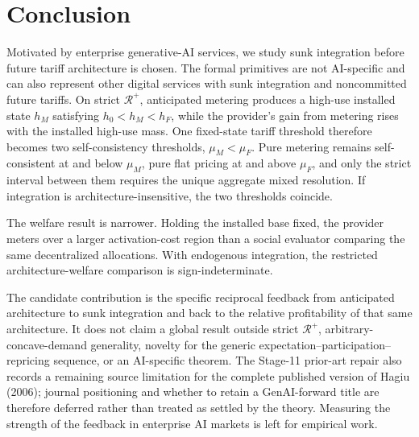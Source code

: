 \section{Conclusion}\label{sec:conclusion}

Motivated by enterprise generative-AI services, we study sunk integration before future tariff architecture is chosen. The formal primitives are not AI-specific and can also represent other digital services with sunk integration and noncommitted future tariffs. On strict $\mathcal R^+$, anticipated metering produces a high-use installed state $h_M$ satisfying $h_0<h_M<h_F$, while the provider's gain from metering rises with the installed high-use mass. One fixed-state tariff threshold therefore becomes two self-consistency thresholds, $\mu_M<\mu_F$. Pure metering remains self-consistent at and below $\mu_M$, pure flat pricing at and above $\mu_F$, and only the strict interval between them requires the unique aggregate mixed resolution. If integration is architecture-insensitive, the two thresholds coincide.

The welfare result is narrower. Holding the installed base fixed, the provider meters over a larger activation-cost region than a social evaluator comparing the same decentralized allocations. With endogenous integration, the restricted architecture-welfare comparison is sign-indeterminate.

The candidate contribution is the specific reciprocal feedback from anticipated architecture to sunk integration and back to the relative profitability of that same architecture. It does not claim a global result outside strict $\mathcal R^+$, arbitrary-concave-demand generality, novelty for the generic expectation--participation--repricing sequence, or an AI-specific theorem. The Stage-11 prior-art repair also records a remaining source limitation for the complete published version of Hagiu (2006); journal positioning and whether to retain a GenAI-forward title are therefore deferred rather than treated as settled by the theory. Measuring the strength of the feedback in enterprise AI markets is left for empirical work.
